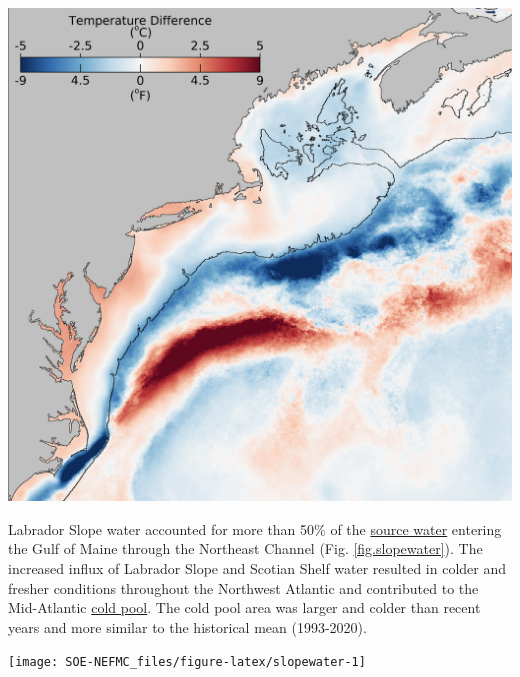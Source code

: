 \documentclass[
  10pt,
]{article}
\let\origfigure\figure
\let\endorigfigure\endfigure
\renewenvironment{figure}[1][2] {
    \expandafter\origfigure\expandafter[H]
} {
    \endorigfigure
}
\begin{document}
\begin{figure}

{\centering \includegraphics[width=22.92in]{SOE-NEFMC_files/figure-latex/slopesea-1} 

}

\caption{February 2024 sea surface temperature difference compared to the February 2000-2020 long-term mean from the NOAA Advanced Clear-Sky Processor for Ocean (ACSPO) Super-collated SST.}\label{fig:slopesea}
\end{figure}

Labrador Slope water accounted for more than 50\% of the \href{https://noaa-edab.github.io/catalog/slopewater.html}{source water} entering the Gulf of Maine through the Northeast Channel (Fig. \ref{fig.slopewater}). The increased influx of Labrador Slope and Scotian Shelf water resulted in colder and fresher conditions throughout the Northwest Atlantic and contributed to the Mid-Atlantic \href{https://noaa-edab.github.io/catalog/cold_pool.html}{cold pool}. The cold pool area was larger and colder than recent years and more similar to the historical mean (1993-2020).

\begin{figure}

{\centering \texttt{[image: SOE-NEFMC\_files/figure-latex/slopewater-1]} 

}

\caption{The proportion of Warm Slope Water (WSW) and Labrador Slope Water (LSW) enter the Gulf of Maine through the Northeast Channel. The orange and teal dashed lines represent the long-term proportion averages for the WSW and LSW respectively.}\label{fig:slopewater}
\end{figure}
\end{document}
